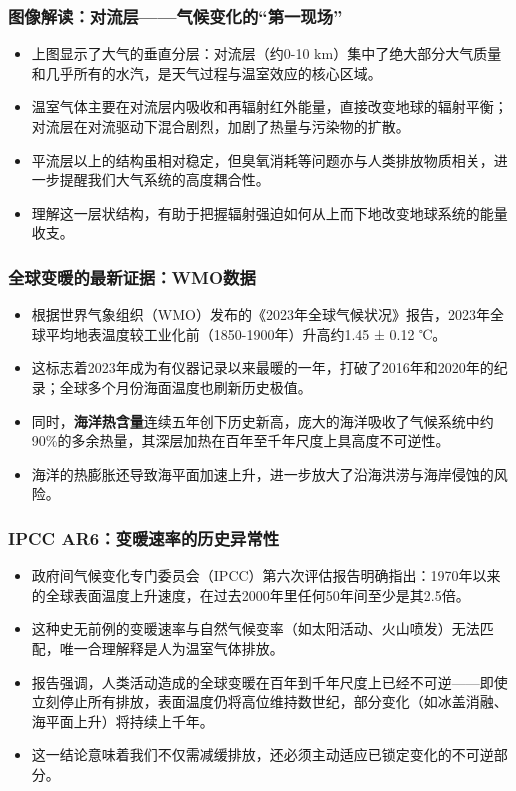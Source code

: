 \documentclass[11pt]{beamer}
\begin{document}
\begin{frame}
\frametitle{图像解读：对流层——气候变化的“第一现场”}
\begin{itemize}
    \item 上图显示了大气的垂直分层：\alert{对流层}（约0-10 km）集中了绝大部分大气质量和几乎所有的水汽，是天气过程与温室效应的核心区域。
    \item 温室气体主要在对流层内吸收和再辐射红外能量，直接改变地球的辐射平衡；对流层在对流驱动下混合剧烈，加剧了热量与污染物的扩散。
    \item 平流层以上的结构虽相对稳定，但臭氧消耗等问题亦与人类排放物质相关，进一步提醒我们大气系统的高度耦合性。
    \item 理解这一层状结构，有助于把握\alert{辐射强迫}如何从上而下地改变地球系统的能量收支。
\end{itemize}
\end{frame}

\begin{frame}
\frametitle{全球变暖的最新证据：WMO数据}
\begin{itemize}
    \item 根据世界气象组织（WMO）发布的《2023年全球气候状况》报告，2023年全球平均地表温度较工业化前（1850-1900年）升高约\alert{1.45 ± 0.12 ℃}。
    \item 这标志着2023年成为有仪器记录以来\alert{最暖的一年}，打破了2016年和2020年的纪录；全球多个月份海面温度也刷新历史极值。
    \item 同时，\textbf{海洋热含量}连续五年创下历史新高，庞大的海洋吸收了气候系统中约90\%的多余热量，其深层加热在百年至千年尺度上具高度\alert{不可逆性}。
    \item 海洋的热膨胀还导致海平面加速上升，进一步放大了沿海洪涝与海岸侵蚀的风险。
\end{itemize}
\end{frame}

\begin{frame}
\frametitle{IPCC AR6：变暖速率的历史异常性}
\begin{itemize}
    \item 政府间气候变化专门委员会（IPCC）第六次评估报告明确指出：1970年以来的全球表面温度上升速度，在过去\alert{2000年里任何50年间}至少是其\alert{2.5倍}。
    \item 这种史无前例的变暖速率与自然气候变率（如太阳活动、火山喷发）无法匹配，唯一合理解释是\alert{人为温室气体排放}。
    \item 报告强调，人类活动造成的全球变暖在\alert{百年到千年尺度上已经不可逆}——即使立刻停止所有排放，表面温度仍将高位维持数世纪，部分变化（如冰盖消融、海平面上升）将持续上千年。
    \item 这一结论意味着我们不仅需减缓排放，还必须主动适应已锁定变化的不可逆部分。
\end{itemize}
\end{frame}
\end{document}
